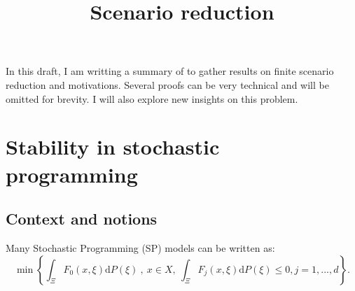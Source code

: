 \documentclass{amsart}
\title{Scenario reduction}
\begin{document}
\LinesNumbered
{}
\maketitle
In this draft, I am writting a summary of \cite{rujeerapaiboon_scenario_2022} to gather results on finite scenario reduction and motivations. Several proofs can be very technical and will be omitted for brevity. I will also explore new insights on this problem.

\section{Stability in stochastic programming}
\subsection{Context and notions}
Many Stochastic Programming (SP) models can be written as:
\begin{equation}\label{stochastic}
\min\left\{\int_\Xi F_0\left(x,\xi\right)\text{d}P\left(\xi\right)\:,\: x\in X, \: \int_\Xi F_j\left(x,\xi\right)\text{d}P\left(\xi\right)\leq0, j=1,...,d\right\}.
\end{equation}
\end{document}
